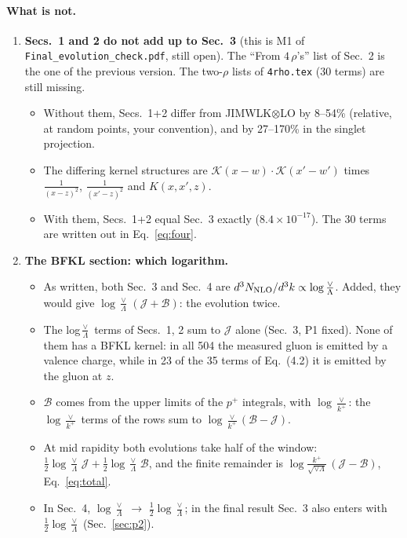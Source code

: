 \documentclass[10pt]{article}
\numberwithin{equation}{section}
\newcommand{\new}[1]{{\color{blue}#1}}
\newcommand{\old}[1]{{\color{red}#1}}
\begin{document}
\paragraph{What is not.}
\begin{enumerate}
\item[\textbf{P1}] \textbf{Secs.~1 and 2 do not add up to Sec.~3} (this is M1 of \texttt{Final\_evolution\_check.pdf}, still open). The ``From $4\,\rho$'s'' list of Sec.~2 is the one of the previous version. The two-$\rho$ lists of \texttt{4rho.tex} (30 terms) are still missing.
\begin{itemize}
\item Without them, Secs.~1+2 differ from JIMWLK$\otimes$LO by 8--54\% (relative, at random points, your convention), and by 27--170\% in the singlet projection.
\item The differing kernel structures are $\mathcal K(x-w)\cdot\mathcal K(x'-w')$ times $\frac{1}{(x-z)^2}$, $\frac{1}{(x'-z)^2}$ and $K(x,x',z)$.
\item With them, Secs.~1+2 equal Sec.~3 exactly ($8.4\times10^{-17}$). The 30 terms are written out in Eq.~\eqref{eq:four}.
\end{itemize}
\item[\textbf{P2}] \textbf{The BFKL section: which logarithm.}
\begin{itemize}
\item As written, both Sec.~3 and Sec.~4 are $d^3N_{\rm NLO}/d^3k\propto\log\frac{\vee}{\Lambda}$. Added, they would give $\log\frac{\vee}{\Lambda}\,(\mathcal J+\mathcal B)$: the evolution twice.
\item The log$\frac{\vee}{\Lambda}$ terms of Secs.~1, 2 sum to $\mathcal J$ alone (Sec.~3, P1 fixed). None of them has a BFKL kernel: in all 504 the measured gluon is emitted by a valence charge, while in 23 of the 35 terms of Eq.~(4.2) it is emitted by the gluon at $z$.
\item $\mathcal B$ comes from the upper limits of the $p^+$ integrals, with $\log\frac{\vee}{k^+}$: the $\log\frac{\vee}{k^+}$ terms of the rows sum to $\log\frac{\vee}{k^+}(\mathcal B-\mathcal J)$.
\item At mid rapidity both evolutions take half of the window: $\frac12\log\frac{\vee}{\Lambda}\,\mathcal J+\frac12\log\frac{\vee}{\Lambda}\,\mathcal B$, and the finite remainder is $\log\frac{k^+}{\sqrt{\vee\Lambda}}\,(\mathcal J-\mathcal B)$, Eq.~\eqref{eq:total}.
\item In Sec.~4, \old{$\log\frac{\vee}{\Lambda}$} $\to$ \new{$\frac12\log\frac{\vee}{\Lambda}$}; in the final result Sec.~3 also enters with $\frac12\log\frac{\vee}{\Lambda}$ (Sec.~\ref{sec:p2}).

\end{itemize}
\end{enumerate}
\end{document}
